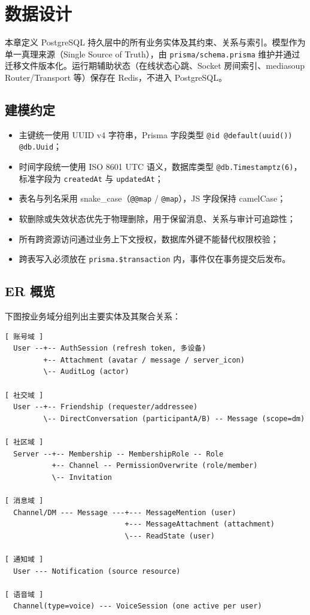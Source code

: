 \section{数据设计}

本章定义 PostgreSQL 持久层中的所有业务实体及其约束、关系与索引。模型作为单一真理来源（Single Source of Truth），由 \texttt{prisma/schema.prisma} 维护并通过迁移文件版本化。运行期辅助状态（在线状态心跳、Socket 房间索引、mediasoup Router/Transport 等）保存在 Redis，不进入 PostgreSQL。

\subsection{建模约定}

\begin{itemize}
  \item 主键统一使用 UUID v4 字符串，Prisma 字段类型 \texttt{@id @default(uuid()) @db.Uuid}；
  \item 时间字段统一使用 ISO 8601 UTC 语义，数据库类型 \texttt{@db.Timestamptz(6)}，标准字段为 \texttt{createdAt} 与 \texttt{updatedAt}；
  \item 表名与列名采用 snake\_case（\texttt{@@map} / \texttt{@map}），JS 字段保持 camelCase；
  \item 软删除或失效状态优先于物理删除，用于保留消息、关系与审计可追踪性；
  \item 所有跨资源访问通过业务上下文授权，数据库外键不能替代权限校验；
  \item 跨表写入必须放在 \texttt{prisma.\$transaction} 内，事件仅在事务提交后发布。
\end{itemize}

\subsection{ER 概览}

下图按业务域分组列出主要实体及其聚合关系：

\begin{verbatim}
[ 账号域 ]
  User --+-- AuthSession (refresh token, 多设备)
         +-- Attachment (avatar / message / server_icon)
         \-- AuditLog (actor)

[ 社交域 ]
  User --+-- Friendship (requester/addressee)
         \-- DirectConversation (participantA/B) -- Message (scope=dm)

[ 社区域 ]
  Server --+-- Membership -- MembershipRole -- Role
           +-- Channel -- PermissionOverwrite (role/member)
           \-- Invitation

[ 消息域 ]
  Channel/DM --- Message ---+--- MessageMention (user)
                            +--- MessageAttachment (attachment)
                            \--- ReadState (user)

[ 通知域 ]
  User --- Notification (source resource)

[ 语音域 ]
  Channel(type=voice) --- VoiceSession (one active per user)
\end{verbatim}

